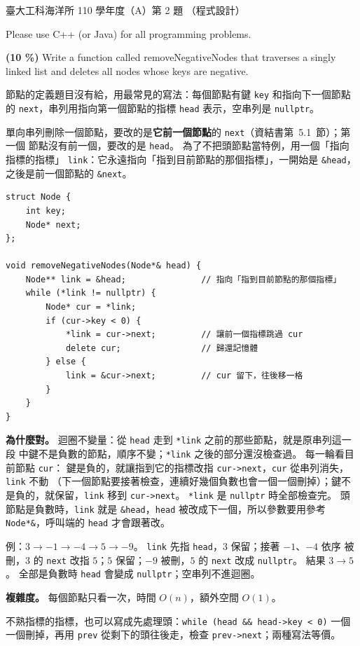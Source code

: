 \begin{pastexam}[label={px:ntu-110-esoe-ds-02}]{臺大工科海洋所 110 學年度（A）第 2 題}
（程式設計）

Please use C++ (or Java) for all programming problems.

\textbf{(10 \%)} Write a function called \textsf{removeNegativeNodes} that traverses a singly linked
list and deletes all nodes whose keys are negative.
\end{pastexam}

\begin{pastsoln}
節點的定義題目沒有給，用最常見的寫法：每個節點有鍵 \texttt{key} 和指向下一個節點的
\texttt{next}，串列用指向第一個節點的指標 \texttt{head} 表示，空串列是 \texttt{nullptr}。

單向串列刪除一個節點，要改的是\textbf{它前一個節點}的 \texttt{next}（資結書第~5.1~節）；第一個
節點沒有前一個，要改的是 \texttt{head}。 為了不把頭節點當特例，用一個「指向指標的指標」
\texttt{link}：它永遠指向「指到目前節點的那個指標」，一開始是 \texttt{\&head}，之後是前一個節點的
\texttt{\&next}。
\begin{verbatim}
struct Node {
    int key;
    Node* next;
};

void removeNegativeNodes(Node*& head) {
    Node** link = &head;               // 指向「指到目前節點的那個指標」
    while (*link != nullptr) {
        Node* cur = *link;
        if (cur->key < 0) {
            *link = cur->next;         // 讓前一個指標跳過 cur
            delete cur;                // 歸還記憶體
        } else {
            link = &cur->next;         // cur 留下，往後移一格
        }
    }
}
\end{verbatim}

\textbf{為什麼對。} 迴圈不變量：從 \texttt{head} 走到 \texttt{*link} 之前的那些節點，就是原串列這一段
中鍵不是負數的節點，順序不變；\texttt{*link} 之後的部分還沒檢查過。 每一輪看目前節點 \texttt{cur}：
鍵是負的，就讓指到它的指標改指 \texttt{cur->next}，\texttt{cur} 從串列消失，\texttt{link} 不動
（下一個節點要接著檢查，連續好幾個負數也會一個一個刪掉）；鍵不是負的，就保留，\texttt{link} 移到
\texttt{cur->next}。 \texttt{*link} 是 \texttt{nullptr} 時全部檢查完。 頭節點是負數時，\texttt{link}
就是 \texttt{\&head}，\texttt{head} 被改成下一個，所以參數要用參考 \texttt{Node*\&}，呼叫端的
\texttt{head} 才會跟著改。

例：$3 \to -1 \to -4 \to 5 \to -9$。 \texttt{link} 先指 \texttt{head}，$3$ 保留；接著 $-1$、$-4$ 依序
被刪，$3$ 的 \texttt{next} 改指 $5$；$5$ 保留；$-9$ 被刪，$5$ 的 \texttt{next} 改成 \texttt{nullptr}。
結果 $3 \to 5$。 全部是負數時 \texttt{head} 會變成 \texttt{nullptr}；空串列不進迴圈。

\textbf{複雜度。} 每個節點只看一次，時間 $O(n)$，額外空間 $O(1)$。

不熟指標的指標，也可以寫成先處理頭：\texttt{while (head \&\& head->key < 0)} 一個一個刪掉，再用
\texttt{prev} 從剩下的頭往後走，檢查 \texttt{prev->next}；兩種寫法等價。
\end{pastsoln}
